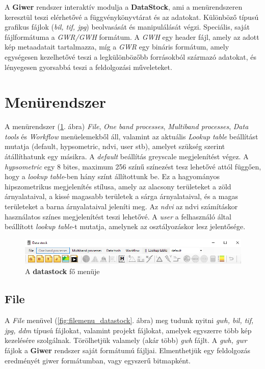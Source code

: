 \documentclass[a4paper,12pt]{book}
\begin{document}
A \textbf{Giwer} rendszer interaktív modulja a \textbf{DataStock}, ami a menürendszeren keresztül teszi elérhetővé a függvénykönyvtárat és az adatokat. Különböző típusú grafikus fájlok (\textit{bil, tif, jpg}) beolvasását és manipulálását végzi. Speciális, saját fájlformátuma a \textit{GWR/GWH} formátum. A \textit{GWH} egy header fájl, amely az adott kép metaadatait tartalmazza, míg a \textit{GWR} egy bináris formátum, amely egységesen kezelhetővé teszi a legkülönbözőbb forrásokból származó adatokat, és lényegesen gyorsabbá teszi a feldolgozási műveleteket.

\section{Menürendszer}

A menürendszer (\ref{fig:datastock_fomenu}. ábra) \textit{File}, \textit{One band processes}, \textit{Multiband processes}, \textit{Data tools} és \textit{Workflow} menüelemekből áll, valamint  az aktuális \textit{Lookup table} beállítást mutatja (default, hypsometric, ndvi, user stb), amelyet szükség szerint átállíthatunk egy másikra. A \textit{default} beállítás greyscale megjelenítést végez. A \textit{hypsometric} egy 8 bites, maximum 256 színű színezést tesz lehetővé attól függően, hogy a \textit{lookup table}-ben hány színt állítottunk be. Ez a hagyományos hipszometrikus megjelenítés stílusa, amely az alacsony területeket a zöld árnyalataival, a kissé magasabb területek a sárga árnyalataival, és a magas területeket a barna árnyalataival jeleníti meg. Az \textit{ndvi} az ndvi számításkor használatos színes megjelenítést teszi lehetővé. A \textit{user} a felhasználó által beállított \textit{lookup table}-t mutatja, amelynek az osztályozáskor lesz jelentősége.

\begin{figure}
	\centering
	\includegraphics[width=14cm]{datastock_fomenu.png}
	\caption{A \textbf{datastock} fő menüje}
	\label{fig:datastock_fomenu}
\end{figure}

\subsection{File}

A \textit{File} menüvel (\ref{fig:filemenu_datastock}. ábra) meg tudunk nyitni \textit{gwh, bil, tif, jpg, ddm} típusú fájlokat, valamint projekt fájlokat, amelyek egyszerre több kép kezelésére szolgálnak. Törölhetjük valamely (akár több) \textit{gwh} fájlt. A \textit{gwh, gwr} fájlok a \textbf{Giwer} rendszer saját formátumú fájljai. Elmenthetjük egy feldolgozás eredményét giwer formátumban, vagy egyszerű bitmapként. 
\end{document}
